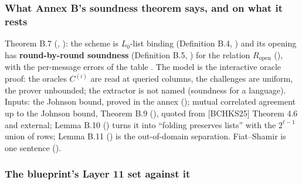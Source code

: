 \subsubsection{What Annex B's soundness theorem says, and on what it rests}\label{sec:gen-opening-thm-rbr}

Theorem B.7 (, ): the scheme is $L_0$-list binding (Definition B.4,
) and its opening has \textbf{round-by-round soundness} (Definition B.5,
) for the relation $R_{\mathrm{open}}$ (), with the per-message errors
of the table . The model is the interactive oracle proof: the oracles $C^{(i)}$ are
read at queried columns, the challenges are uniform, the prover unbounded; the extractor is not
named (soundness for a language). Inputs: the Johnson bound, proved in the annex
(); mutual correlated agreement up to the Johnson bound, Theorem B.9
(), quoted from [BCHKS25] Theorem 4.6 and external; Lemma B.10 ()
turns it into ``folding preserves lists'' with the $2^{ℓ−1}$ union of rows; Lemma B.11
() is the out-of-domain separation. Fiat--Shamir is one sentence ().

\subsubsection{The blueprint's Layer 11 set against it}\label{sec:gen-opening-blueprint-layer11}

